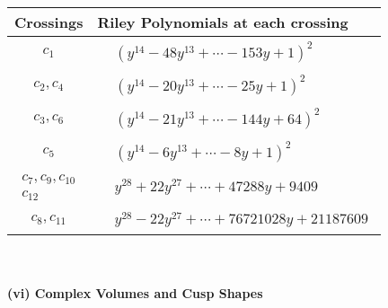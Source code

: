 \documentclass[1p]{elsarticle_modified}
\theoremstyle{definition}
\begin{document}
\begin{tabular}{m{50pt}|m{274pt}}
Crossings & \hspace{64pt}Riley Polynomials at each crossing \\
\hline $$\begin{aligned}c_{1}\end{aligned}$$&$\begin{aligned}
&(y^{14}-48 y^{13}+\cdots-153 y+1)^{2}
\end{aligned}$\\
\hline $$\begin{aligned}c_{2},c_{4}\end{aligned}$$&$\begin{aligned}
&(y^{14}-20 y^{13}+\cdots-25 y+1)^{2}
\end{aligned}$\\
\hline $$\begin{aligned}c_{3},c_{6}\end{aligned}$$&$\begin{aligned}
&(y^{14}-21 y^{13}+\cdots-144 y+64)^{2}
\end{aligned}$\\
\hline $$\begin{aligned}c_{5}\end{aligned}$$&$\begin{aligned}
&(y^{14}-6 y^{13}+\cdots-8 y+1)^{2}
\end{aligned}$\\
\hline $$\begin{aligned}c_{7},c_{9},c_{10}\\c_{12}\end{aligned}$$&$\begin{aligned}
&y^{28}+22 y^{27}+\cdots+47288 y+9409
\end{aligned}$\\
\hline $$\begin{aligned}c_{8},c_{11}\end{aligned}$$&$\begin{aligned}
&y^{28}-22 y^{27}+\cdots+76721028 y+21187609
\end{aligned}$\\
\hline
\end{tabular}\\~\\
\newpage\flushleft \textbf{(vi) Complex Volumes and Cusp Shapes}
\end{document}
